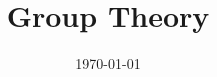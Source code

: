 \documentclass[11pt,twoside=semi,openright,numbers=noenddot]{scrbook}
\begin{document}
\frontmatter

\title{Group Theory}
\date{\today}
\maketitle

\tableofcontents

\mainmatter


\end{document}
